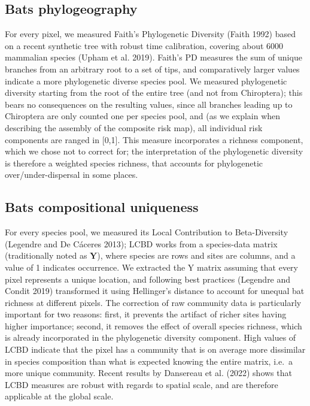 \documentclass[11pt]{article}
\begin{document}
\hypertarget{bats-phylogeography}{%
\subsection{Bats phylogeography}\label{bats-phylogeography}}

For every pixel, we measured Faith's Phylogenetic Diversity (Faith 1992)
based on a recent synthetic tree with robust time calibration, covering
about 6000 mammalian species (Upham et al. 2019). Faith's PD measures
the sum of unique branches from an arbitrary root to a set of tips, and
comparatively larger values indicate a more phylogenetic diverse species
pool. We measured phylogenetic diversity starting from the root of the
entire tree (and not from Chiroptera); this bears no consequences on the
resulting values, since all branches leading up to Chiroptera are only
counted one per species pool, and (as we explain when describing the
assembly of the composite risk map), all individual risk components are
ranged in {[}0,1{]}. This measure incorporates a richness component,
which we chose not to correct for; the interpretation of the
phylogenetic diversity is therefore a weighted species richness, that
accounts for phylogenetic over/under-dispersal in some places.

\hypertarget{bats-compositional-uniqueness}{%
\subsection{Bats compositional
uniqueness}\label{bats-compositional-uniqueness}}

For every species pool, we measured its Local Contribution to
Beta-Diversity (Legendre and De Cáceres 2013); LCBD works from a
species-data matrix (traditionally noted as \(\mathbf{Y}\)), where
species are rows and sites are columns, and a value of 1 indicates
occurrence. We extracted the Y matrix assuming that every pixel
represents a unique location, and following best practices (Legendre and
Condit 2019) transformed it using Hellinger's distance to account for
unequal bat richness at different pixels. The correction of raw
community data is particularly important for two reasons: first, it
prevents the artifact of richer sites having higher importance; second,
it removes the effect of overall species richness, which is already
incorporated in the phylogenetic diversity component. High values of
LCBD indicate that the pixel has a community that is on average more
dissimilar in species composition than what is expected knowing the
entire matrix, i.e.~a more unique community. Recent results by Dansereau
et al. (2022) shows that LCBD measures are robust with regards to
spatial scale, and are therefore applicable at the global scale.
\end{document}
